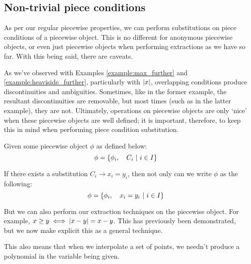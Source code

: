 \subsection{Non-trivial piece conditions}
As per our regular piecewise properties, we can perform substitutions on piece conditions of a piecewise object. This is no different for anonymous piecewise objects, or even just piecewise objects when performing extractions as we have so far. With this being said, there are caveats.

As we've observed with Examples \ref{example:max_further} and \ref{example:heaviside_further}, particularly with $\abs{x}$, overlapping conditions produce discontinuities and ambiguities. Sometimes, like in the former example, the resultant discontinuities are removable, but most times (such as in the latter example), they are not. Ultimately, operations on piecewise objects are only `nice' when these piecewise objects are well defined; it is important, therefore, to keep this in mind when performing piece condition substitution.

\begin{theorem}
    Given some piecewise object $\phi$ as defined below:
    $$
        \phi=\left\{\phi_i,\quad C_i\ \middle|\ i\in I\right\}
    $$

    If there exists a substitution $C_i\rightarrow x_i=y_i$, then not only can we write $\phi$ as the following:
    $$
        \phi=\left\{\phi_i,\quad x_i=y_i\ \middle|\ i\in I\right\}
    $$

    But we can also perform our extraction techniques on the piecewise object. For example, $x\geq y\iff \abs{x-y}=x-y$. This has previously been demonstrated, but we now make explicit this as a general technique.
\end{theorem}

This also means that when we interpolate a set of points, we needn't produce a polynomial in the variable being given.

